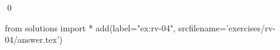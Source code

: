 
\begin{ex} 
  \label{ex:rv-04}
  
  \qed
\end{ex} 
\begin{python0}
from solutions import *
add(label="ex:rv-04",
    srcfilename='exercises/rv-04/answer.tex') 
\end{python0}
